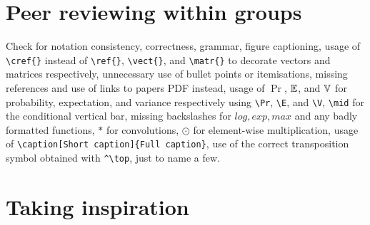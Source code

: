 \section*{Peer reviewing within groups}

Check for notation consistency, correctness, grammar, figure captioning, usage of \verb|\cref{}| instead of \verb|\ref{}|, \verb|\vect{}|, and \verb|\matr{}| to decorate vectors and matrices respectively, unnecessary use of bullet points or itemisations, missing references and use of links to papers PDF instead, usage of  $\Pr$, $\operatorname{\mathbb{E}}$, and $\operatorname{\mathbb{V}}$ for probability, expectation, and variance respectively using \verb|\Pr|, \verb|\E|, and \verb|\V|, \verb|\mid| for the conditional vertical bar, missing backslashes for $log, exp, max$ and any badly formatted functions, $\ast$ for convolutions, $\odot$ for element-wise multiplication, usage of \verb|\caption[Short caption]{Full caption}|, use of the correct transposition symbol obtained with \verb|^\top|, just to name a few.

\section*{Taking inspiration}

